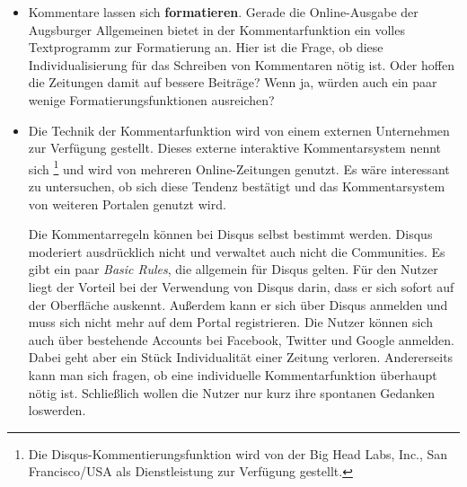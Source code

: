 \begin{itemize}
  \item Kommentare lassen sich {\bfseries formatieren}. Gerade die Online-Ausgabe der Augsburger
    Allgemeinen bietet in der Kommentarfunktion ein volles Textprogramm zur Formatierung an.  Hier
    ist die Frage, ob diese Individualisierung für das Schreiben von  Kommentaren nötig ist. Oder
    hoffen die Zeitungen damit auf bessere Beiträge? Wenn ja, würden auch ein paar wenige
    Formatierungsfunktionen ausreichen?

  \item Die Technik der Kommentarfunktion wird von einem externen Unternehmen zur Verfügung
    gestellt. Dieses externe interaktive Kommentarsystem nennt sich \grqq\footnote{Die Disqus-Kommentierungsfunktion wird von der Big Head Labs, Inc., San
    Francisco/USA als Dienstleistung zur Verfügung gestellt.} und wird von mehreren Online-Zeitungen
    genutzt. Es wäre interessant zu untersuchen, ob sich diese Tendenz bestätigt und das
    Kommentarsystem von weiteren Portalen genutzt wird.

    Die Kommentarregeln können bei Disqus selbst bestimmt werden. Disqus moderiert ausdrücklich
    nicht und verwaltet auch nicht die Communities. Es gibt ein paar \emph{Basic Rules}, die
    allgemein für Disqus gelten. Für den Nutzer liegt der Vorteil bei der Verwendung von Disqus
    darin, dass er sich sofort auf der Oberfläche auskennt. Außerdem kann er sich über Disqus
    anmelden und muss sich nicht mehr auf dem Portal registrieren. Die Nutzer können sich auch über
    bestehende Accounts bei Facebook, Twitter und Google anmelden. Dabei geht aber ein Stück
    Individualität einer Zeitung verloren.  Andererseits kann man sich fragen, ob eine individuelle
    Kommentarfunktion überhaupt nötig ist.  Schließlich wollen die Nutzer nur kurz ihre spontanen
    Gedanken loswerden.



\end{itemize}
